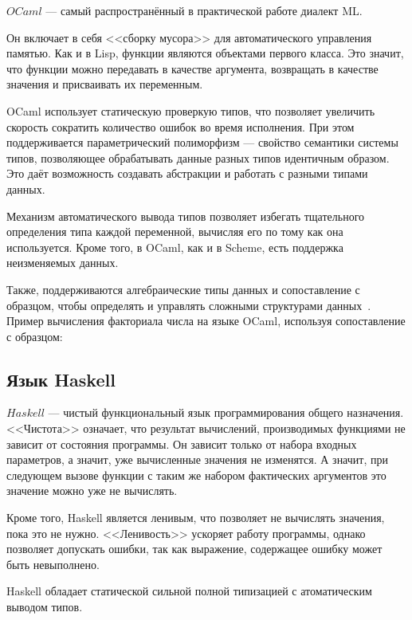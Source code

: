         $OCaml$ --- самый распространённый в практической работе диалект ML.

        Он включает в себя <<сборку мусора>> для автоматического управления памятью.
        Как и в Lisp, функции являются объектами первого класса.
        Это значит, что функции можно передавать в качестве аргумента, возвращать в качестве значения и присваивать их переменным.

        OCaml использует статическую проверкую типов, что позволяет увеличить скорость сократить количество ошибок во время исполнения.
        При этом поддерживается параметрический полиморфизм --- свойство семантики системы типов, позволяющее обрабатывать данные разных типов идентичным образом.
        Это даёт возможность создавать абстракции и работать с разными типами данных.

        Механизм автоматического вывода типов позволяет избегать тщательного определения типа каждой переменной, вычисляя его по тому как она используется.
        Кроме того, в OCaml, как и в Scheme, есть поддержка неизменяемых данных.

        Также, поддерживаются алгебраические типы данных и сопоставление с образцом, чтобы определять и управлять сложными структурами данных~\cite{ocaml}.
        Пример вычисления факториала числа на языке OCaml, используя сопоставление с образцом:

        

    \subsection{Язык Haskell}
        $Haskell$ --- чистый функциональный язык программирования общего назначения.
        <<Чистота>> означает, что результат вычислений, производимых функциями не зависит от состояния программы.
        Он зависит только от набора входных параметров, а значит, уже вычисленные значения не изменятся.
        А значит, при следующем вызове функции с таким же набором фактических аргументов это значение можно уже не вычислять.

        Кроме того, Haskell является ленивым, что позволяет не вычислять значения, пока это не нужно.
        <<Ленивость>> ускоряет работу программы, однако позволяет допускать ошибки, так как выражение, содержащее ошибку может быть невыполнено.

        Haskell обладает статической сильной полной типизацией с атоматическим выводом типов.
        
